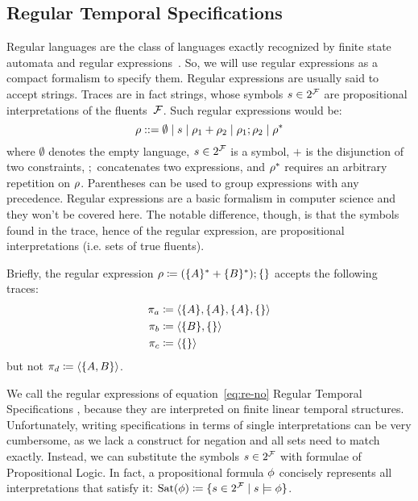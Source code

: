 \subsection{Regular Temporal Specifications}

Regular languages are the class of languages exactly recognized by finite
state automata and regular expressions~\cite{bib:languages-book}. So, we will
use regular expressions as a compact formalism to specify them. Regular
expressions are usually said to accept strings. Traces are in fact strings,
whose symbols $s \in 2^{\mathcal{F}}$ are propositional interpretations of the
fluents~$\mathcal{F}$. Such regular expressions would be:
\begin{equation}
	\rho ::= \emptyset \mid s \mid
	\rho_1 + \rho_2 \mid \rho_1 ; \rho_2 \mid \rho^*
	\label{eq:re-no}
\end{equation}
where $\emptyset$ denotes the empty language, $s \in 2^{\mathcal{F}}$ is a symbol,
$+$ is the disjunction of two constraints, $;$ concatenates two
expressions, and $\rho^*$ requires an arbitrary repetition on $\rho$.
Parentheses can be used to group expressions with any precedence.
Regular expressions are a basic formalism in computer science and they won't
be covered here. The notable difference, though, is that the symbols found in
the trace, hence of the regular expression, are propositional interpretations
(i.e. sets of true fluents).

\begin{example}
	Briefly, the regular expression $\rho \coloneqq (\{A\}^* + \{B\}^*) ;
	\{\}$ accepts the following traces:
	\begin{align*}
		\pi_a &\coloneqq \langle \{A\}, \{A\}, \{A\}, \{\} \rangle \\
		\pi_b &\coloneqq \langle \{B\}, \{\} \rangle \\
		\pi_c &\coloneqq \langle \{\} \rangle \\
	\end{align*}
	but not $\pi_d \coloneqq \langle \{A, B\} \rangle$.
\end{example}

We call the regular expressions of equation~\eqref{eq:re-no} Regular Temporal
Specifications \re{}, because they are interpreted on finite linear temporal
structures. Unfortunately, writing specifications in terms of single
interpretations can be very cumbersome, as we lack a construct for negation
and all sets need to match exactly. Instead, we can substitute the symbols $s
\in 2^{\mathcal{F}}$ with formulae of Propositional Logic. In fact, a propositional
formula $\phi$ concisely represents all interpretations that satisfy
it: $\text{Sat}(\phi) \coloneqq \{s \in 2^{\mathcal{F}} \mid s \models
\phi\}$.

